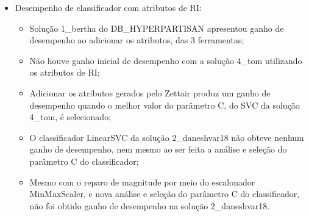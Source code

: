 \documentclass[%
  10pt,%
  aspectratio = 169,%
  compress,%
  t,%
]{beamer}%
\begin{document}
\begin{frame}{}{}
\begin{columns}[t]
\begin{itemize}
                \item Desempenho de classificador com atributos de RI:
                    \begin{itemize}
                        \item Solução 1\_bertha do DB\_HYPERPARTISAN apresentou ganho de desempenho ao adicionar os atributos, das 3 ferramentas;
                        \item Não houve ganho inicial de desempenho com a solução 4\_tom utilizando os atributos de RI;
                        \item Adicionar os atributos gerados pelo Zettair produz um ganho de desempenho quando o melhor valor do parâmetro C, do SVC da solução 4\_tom, é selecionado;
                        \item O classificador LinearSVC da solução 2\_daneshvar18 não obteve nenhum ganho de desempenho, nem mesmo ao ser feita a análise e seleção do parâmetro C do classificador;
                        \item Mesmo com o reparo de magnitude por meio do escalonador MinMaxScaler, e nova análise e seleção do parâmetro C do classificador, não foi obtido ganho de desempenho na solução 2\_daneshvar18.
                    \end{itemize}
                
            \end{itemize}
        \end{columns}
    \end{frame}
\end{document}
